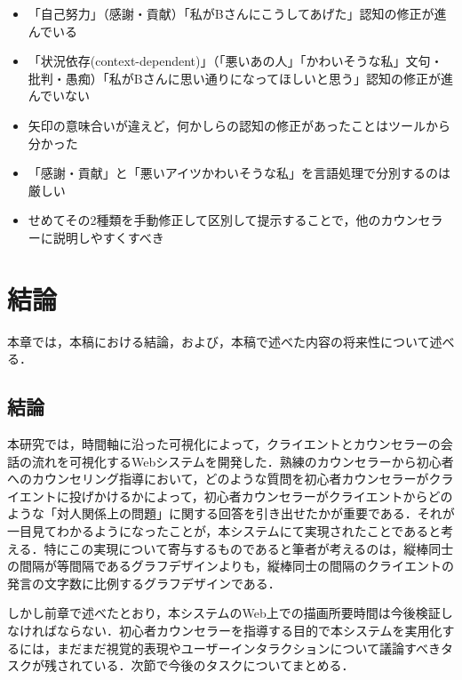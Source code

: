 \documentclass[shuuron]{kuee}
\begin{document}
 \begin{itemize}
 \item 「自己努力」（感謝・貢献）「私がBさんにこうしてあげた」認知の修正が進んでいる
  \item 「状況依存(context-dependent)」（「悪いあの人」「かわいそうな私」文句・批判・愚痴）「私がBさんに思い通りになってほしいと思う」認知の修正が進んでいない
 \end{itemize}



 \begin{itemize}

 \item 矢印の意味合いが違えど，何かしらの認知の修正があったことはツールから分かった
 \item 「感謝・貢献」と「悪いアイツかわいそうな私」を言語処理で分別するのは厳しい

  \item せめてその2種類を手動修正して区別して提示することで，他のカウンセラーに説明しやすくすべき

\end{itemize}
\chapter{結論}

本章では，本稿における結論，および，本稿で述べた内容の将来性について述べる．

\section{結論}

本研究では，時間軸に沿った可視化によって，クライエントとカウンセラーの会話の流れを可視化するWebシステムを開発した．熟練のカウンセラーから初心者へのカウンセリング指導において，どのような質問を初心者カウンセラーがクライエントに投げかけるかによって，初心者カウンセラーがクライエントからどのような「対人関係上の問題」に関する回答を引き出せたかが重要である．それが一目見てわかるようになったことが，本システムにて実現されたことであると考える．特にこの実現について寄与するものであると筆者が考えるのは，縦棒同士の間隔が等間隔であるグラフデザインよりも，縦棒同士の間隔のクライエントの発言の文字数に比例するグラフデザインである．

しかし前章で述べたとおり，本システムのWeb上での描画所要時間は今後検証しなければならない．初心者カウンセラーを指導する目的で本システムを実用化するには，まだまだ視覚的表現やユーザーインタラクションについて議論すべきタスクが残されている．次節で今後のタスクについてまとめる．
\end{document}
